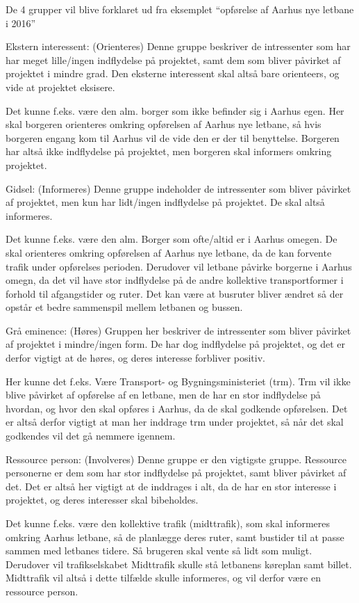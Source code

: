 De 4 grupper vil blive forklaret ud fra eksemplet “opførelse af Aarhus nye letbane i 2016”

Ekstern interessent: (Orienteres)
Denne gruppe beskriver de intressenter som har har meget lille/ingen indflydelse på projektet, samt dem som bliver påvirket af projektet i mindre grad. Den eksterne interessent skal altså bare orienteers, og vide at projektet eksisere. 

Det kunne f.eks. være den alm. borger som ikke befinder sig i Aarhus egen. Her skal borgeren orienteres omkring opførelsen af Aarhus nye letbane, så hvis borgeren engang kom til Aarhus vil de vide den er der til benyttelse. Borgeren har altså ikke indflydelse på projektet, men borgeren skal informers omkring projektet.

Gidsel: (Informeres)
Denne gruppe indeholder de intressenter som bliver påvirket af projektet, men kun har lidt/ingen indflydelse på projektet. De skal altså informeres.

Det kunne f.eks. være den alm. Borger som ofte/altid er i Aarhus omegen. De skal orienteres omkring opførelsen af Aarhus nye letbane, da de kan forvente trafik under opførelses perioden. Derudover vil letbane påvirke borgerne i Aarhus omegn, da det vil have stor indflydelse på de andre kollektive transportformer i forhold til afgangstider og ruter. Det kan være at busruter bliver ændret så der opstår et bedre sammenspil mellem letbanen og bussen.

Grå eminence: (Høres)
Gruppen her beskriver de intressenter som bliver påvirket af projektet i mindre/ingen form. De har dog indflydelse på projektet, og det er derfor vigtigt at de høres, og deres interesse forbliver positiv.

Her kunne det f.eks. Være Transport- og Bygningsministeriet (trm). Trm vil ikke blive påvirket af opførelse af en letbane, men de har en stor indflydelse på hvordan, og hvor den skal opføres i Aarhus, da de skal godkende opførelsen. Det er altså derfor vigtigt at man her inddrage trm under projektet, så når det skal godkendes vil det gå nemmere igennem.

Ressource person: (Involveres)
Denne gruppe er den vigtigste gruppe. Ressource personerne er dem som har stor indflydelse på projektet, samt bliver påvirket af det. Det er altså her vigtigt at de inddrages i alt, da de har en stor interesse i projektet, og deres interesser skal bibeholdes.

Det kunne f.eks. være den kollektive trafik (midttrafik), som skal informeres omkring Aarhus letbane, så de planlægge deres ruter, samt bustider til at passe sammen med letbanes tidere. Så brugeren skal vente så lidt som muligt. Derudover vil trafikselskabet Midttrafik skulle stå letbanens køreplan samt billet. Midttrafik vil altså i dette tilfælde skulle informeres, og vil derfor være en ressource person.


